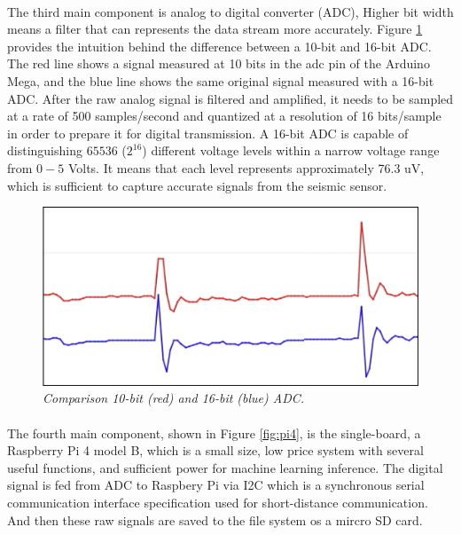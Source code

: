 \paragraph{}
The third main component is analog to digital converter (ADC), Higher bit width means a filter that can represents the data stream more accurately. Figure \ref{fig:adc} provides the intuition behind the difference between a 10-bit and 16-bit ADC.  The red line shows a signal measured at 10 bits in the adc pin of the Arduino Mega, and the blue line shows the same original signal measured with a 16-bit ADC. After the raw analog signal is filtered and amplified, it needs to be sampled at a rate of 500 samples/second and quantized at a resolution of 16 bits/sample in order to prepare it for digital transmission. A 16-bit ADC is capable of distinguishing $65536$ ($2^{16}$) different voltage levels within a narrow voltage range from $0 - 5$ Volts. It means that each level represents approximately 76.3 uV, which is sufficient to capture accurate signals from the seismic sensor.

\begin{figure}[H]
  \centering
  \caption[Comparison 10-bit (red) and 16-bit (blue) ADC.]{\emph{Comparison 10-bit (red) and 16-bit (blue) ADC.}}\label{fig:adc}
  \includegraphics[scale = 0.3]{figures/ADC.jpg}  
\end{figure}

\paragraph{}
The fourth main component, shown in Figure \ref{fig:pi4}, is the single-board, a Raspberry Pi 4 model B, which is a small size, low price system with several useful functions, and sufficient power for machine learning inference. The digital signal is fed from ADC to Raspbery Pi via I2C which is a synchronous serial communication interface specification used for short-distance communication. And then these raw signals are saved to the file system os a mircro SD card.


